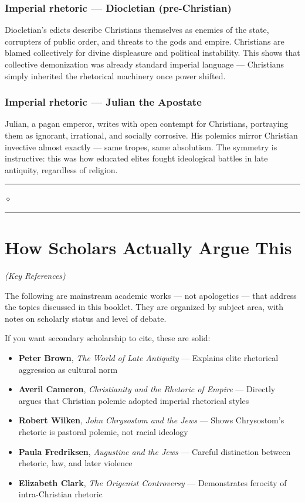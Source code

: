 \documentclass[10pt,twoside,openany]{book}
\newcommand{\ornrule}{%
  \par\bigskip
  {\noindent\hfil{\color{gold}\rule[0.5ex]{1.5in}{0.5pt}%
  \quad$\diamond$\quad%
  \rule[0.5ex]{1.5in}{0.5pt}}\hfil\par}%
  \bigskip
}
\begin{document}
\subsection{Imperial rhetoric --- Diocletian (pre-Christian)}

Diocletian's edicts describe Christians themselves as enemies of the
state, corrupters of public order, and threats to the gods and empire.
Christians are blamed collectively for divine displeasure and political
instability. This shows that collective demonization was already
standard imperial language --- Christians simply inherited the rhetorical
machinery once power shifted.

\subsection{Imperial rhetoric --- Julian the Apostate}

Julian, a pagan emperor, writes with open contempt for Christians,
portraying them as ignorant, irrational, and socially corrosive. His
polemics mirror Christian invective almost exactly --- same tropes, same
absolutism. The symmetry is instructive: this was how educated elites
fought ideological battles in late antiquity, regardless of religion.

\ornrule



\chapter{How Scholars Actually Argue This}
\begin{center}
{\itshape (Key References)}
\end{center}

The following are mainstream academic works --- not apologetics --- that
address the topics discussed in this booklet. They are organized by
subject area, with notes on scholarly status and level of debate.

If you want secondary scholarship to cite, these are solid:

\begin{itemize}[leftmargin=1.5em]
\item \textbf{Peter Brown}, \emph{The World of Late Antiquity} --- Explains elite rhetorical aggression as cultural norm
\item \textbf{Averil Cameron}, \emph{Christianity and the Rhetoric of Empire} --- Directly argues that Christian polemic adopted imperial rhetorical styles
\item \textbf{Robert Wilken}, \emph{John Chrysostom and the Jews} --- Shows Chrysostom's rhetoric is pastoral polemic, not racial ideology
\item \textbf{Paula Fredriksen}, \emph{Augustine and the Jews} --- Careful distinction between rhetoric, law, and later violence
\item \textbf{Elizabeth Clark}, \emph{The Origenist Controversy} --- Demonstrates ferocity of intra-Christian rhetoric
\end{itemize}
\end{document}
